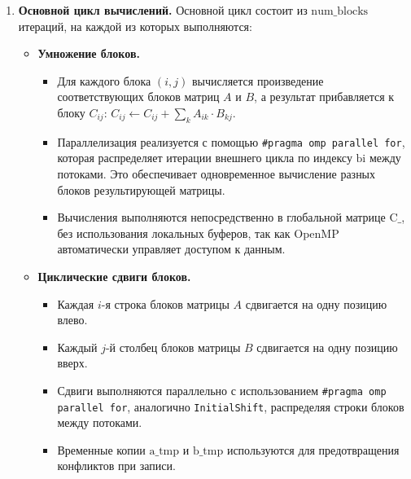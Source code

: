 \documentclass[a4paper,12pt]{article}
\begin{document}
\begin{enumerate}
    \item \textbf{Основной цикл вычислений.}
    Основной цикл состоит из \( \text{num\_blocks} \) итераций, на каждой из которых выполняются:
    \begin{itemize}
        \item \textbf{Умножение блоков.}
        \begin{itemize}
            \item Для каждого блока \( (i, j) \) вычисляется произведение соответствующих блоков матриц \( A \) и \( B \), а результат прибавляется к блоку \( C_{ij} \): \( C_{ij} \gets C_{ij} + \sum_k A_{ik} \cdot B_{kj} \).
            \item Параллелизация реализуется с помощью \texttt{\#pragma omp parallel for}, которая распределяет итерации внешнего цикла по индексу \( \text{bi} \) между потоками. Это обеспечивает одновременное вычисление разных блоков результирующей матрицы.
            \item Вычисления выполняются непосредственно в глобальной матрице \( \text{C\_} \), без использования локальных буферов, так как OpenMP автоматически управляет доступом к данным.
        \end{itemize}
        \item \textbf{Циклические сдвиги блоков.}
        \begin{itemize}
            \item Каждая \( i \)-я строка блоков матрицы \( A \) сдвигается на одну позицию влево.
            \item Каждый \( j \)-й столбец блоков матрицы \( B \) сдвигается на одну позицию вверх.
            \item Сдвиги выполняются параллельно с использованием \texttt{\#pragma omp parallel for}, аналогично \texttt{InitialShift}, распределяя строки блоков между потоками.
            \item Временные копии \( \text{a\_tmp} \) и \( \text{b\_tmp} \) используются для предотвращения конфликтов при записи.
        \end{itemize}
    \end{itemize}
\end{enumerate}
\end{document}
